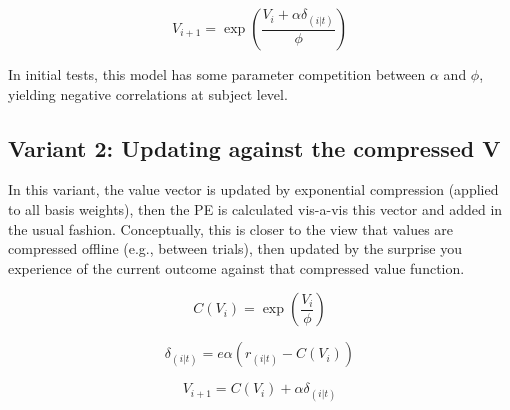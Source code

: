 \documentclass[11pt]{amsart}
\begin{document}
\begin{equation}
V_{i+1} = \exp(\frac{V_i + \alpha \delta_{(i | t)}}{\phi})
\end{equation}

In initial tests, this model has some parameter competition between $\alpha$ and $\phi$, yielding negative correlations at subject level.

\subsection{Variant 2: Updating against the compressed V}

In this variant, the value vector is updated by exponential compression (applied to all basis weights), then the PE is calculated vis-a-vis this vector and added in the usual fashion.
Conceptually, this is closer to the view that values are compressed offline (e.g., between trials), then updated by the surprise you experience of the current outcome against that compressed value function.

\begin{equation}
C(V_i) =  \exp(\frac{V_i}{\phi})
\end{equation}

\begin{equation}
\delta_{(i | t)} = e \alpha( r_{(i | t)} - C(V_i))
\end{equation}

\begin{equation}
V_{i+1} =  C(V_i) + \alpha \delta_{(i | t)}
\end{equation}
\end{document}
